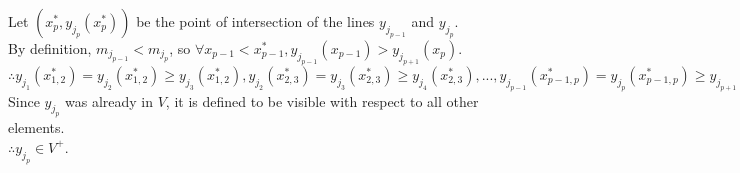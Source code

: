 \documentclass{article}
\begin{document}
Let $(x^*_p, y_{j_p}(x^*_p))$ be the point of intersection of the lines $y_{j_{p-1}}$ and $y_{j_{p}}$.\\
By definition, $m_{j_{p-1}} < m_{j_{p}}$, so $\forall x_{p-1} < x^*_{p-1}, y_{j_{p-1}} (x_{p-1}) > y_{j_{p+1}} (x_p)$.\\
$\therefore y_{j_{1}}(x^*_{1,2}) = y_{j_{2}}(x^*_{1,2}) \geq y_{j_3}(x^*_{1,2}), y_{j_{2}}(x^*_{2,3}) = y_{j_{3}}(x^*_{2,3}) \geq y_{j_4}(x^*_{2,3}), ..., y_{j_{p-1}}(x^*_{p-1,p}) = y_{j_{p}}(x^*_{p-1,p}) \geq y_{j_{p+1}}(x^*_{p-1,p}), ..., y_{j_{k-1}}(x^*_{k-1,k}) = y_{j_{k}}(x^*_{k-1,k}) \geq y_{j_{i}}(x^*_{k-1,k})$\\
Since $y_{j_p}$ was already in $V$, it is defined to be visible with respect to all other elements.\\
$\therefore y_{j_p} \in V^+$.
\end{document}
